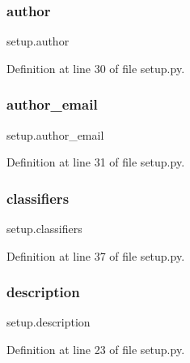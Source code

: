 \subsubsection{\texorpdfstring{author}{author}}
{\footnotesize\ttfamily setup.\+author}



Definition at line 30 of file setup.\+py.

\mbox{\label{namespacesetup_a5b08034343aa2be607722a8b315f3625}} 
\subsubsection{\texorpdfstring{author\+\_\+email}{author\_email}}
{\footnotesize\ttfamily setup.\+author\+\_\+email}



Definition at line 31 of file setup.\+py.

\mbox{\label{namespacesetup_abe96a9c38c1c61f9f0fdb002c482f785}} 
\subsubsection{\texorpdfstring{classifiers}{classifiers}}
{\footnotesize\ttfamily setup.\+classifiers}



Definition at line 37 of file setup.\+py.

\mbox{\label{namespacesetup_aedf461ec52a946bda975938ba0b93ec0}} 
\subsubsection{\texorpdfstring{description}{description}}
{\footnotesize\ttfamily setup.\+description}



Definition at line 23 of file setup.\+py.

\mbox{\label{namespacesetup_a443be2d01fd539bf6761aff70724d876}} 
